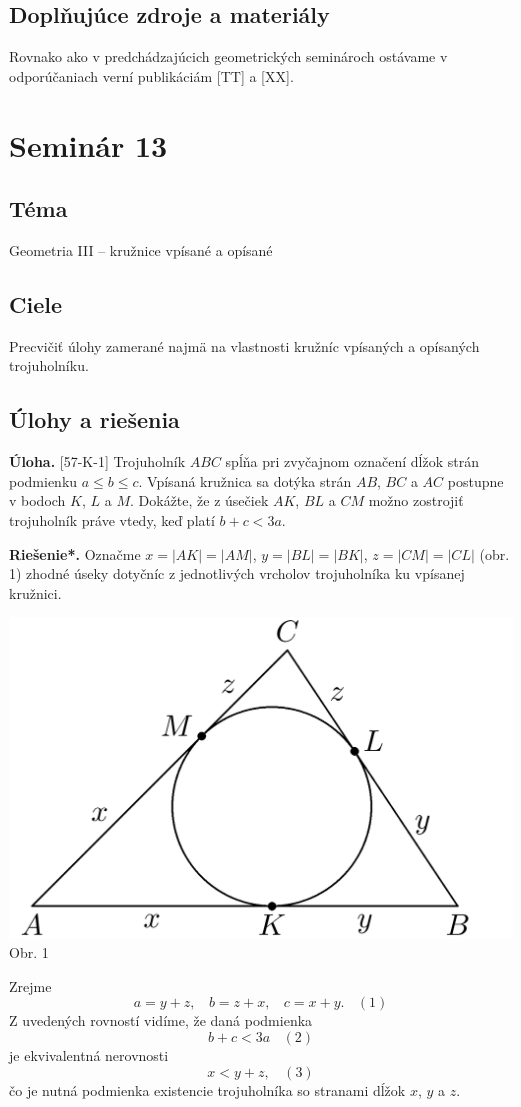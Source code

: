 \documentclass[11pt,a4paper,oneside,final]{book}
\newcommand{\ul}{\textbf{Úloha.} }
\newcommand{\rieh}{\textbf{Riešenie*.} }
\begin{document}
\subsection*{Doplňujúce zdroje a materiály}
Rovnako ako v predchádzajúcich geometrických seminároch ostávame v odporúčaniach verní publikáciám [TT] a [XX].
\newpage

\section*{Seminár 13}
\subsection*{Téma}
Geometria III -- kružnice vpísané a opísané

\subsection*{Ciele}
Precvičiť úlohy zamerané najmä na vlastnosti kružníc vpísaných a opísaných trojuholníku.

\subsection*{Úlohy a riešenia}
\begin{tcolorbox}[breakable,notitle,boxrule=0pt,colback=light-gray,colframe=light-gray]\ul [57-K-1] Trojuholník $ABC$ spĺňa pri zvyčajnom označení dĺžok strán podmienku $a \leq b \leq c$. Vpísaná kružnica sa dotýka strán $AB$, $BC$ a $AC$ postupne v bodoch $K$, $L$ a $M$. Dokážte, že z úsečiek $AK$, $BL$ a $CM$ možno zostrojiť trojuholník práve vtedy, keď platí $b + c < 3a$.

\end{tcolorbox}

\rieh Označme $x = |AK| = |AM|$, $y = |BL| = |BK|$, $z = |CM| = |CL|$ (obr. 1) zhodné úseky dotyčníc z jednotlivých vrcholov trojuholníka ku vpísanej kružnici.
\begin{center}
\includegraphics[scale=0.3]{57K1}\\

Obr. 1
\end{center}
Zrejme
$$a= y + z, \ \ \ \ b = z + x, \ \ \ \ c = x + y. \ \ \ \ (1)$$
Z uvedených rovností vidíme, že daná podmienka
$$b + c < 3a \ \ \ \ (2)$$
je ekvivalentná nerovnosti
$$x < y + z, \ \ \ \ (3)$$
čo je nutná podmienka existencie trojuholníka so stranami dĺžok $x$, $y$ a $z$.
\end{document}
